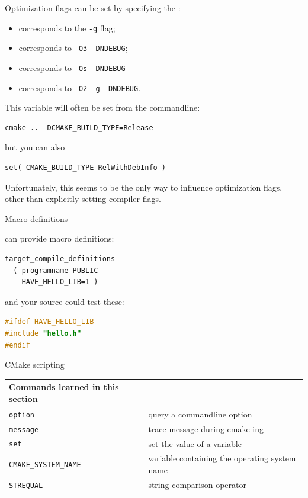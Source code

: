 Optimization flags can be set by specifying the :
\begin{itemize}
\item 
     corresponds to the \lstinline[language=shell]{-g} flag;
\item
     corresponds to \lstinline[language=shell]{-O3 -DNDEBUG};
\item
     corresponds to \lstinline[language=shell]{-Os -DNDEBUG}
\item 
     corresponds to \lstinline[language=shell]{-O2 -g -DNDEBUG}.
\end{itemize}
This variable will often be set from the commandline:
\begin{lstlisting}[language=shell]
cmake .. -DCMAKE_BUILD_TYPE=Release
\end{lstlisting}
but you can also
\begin{lstlisting}
set( CMAKE_BUILD_TYPE RelWithDebInfo )
\end{lstlisting}
Unfortunately, this seems to be the only way to influence optimization flags,
other than explicitly setting compiler flags.

 {Macro definitions}

 can provide macro definitions:
\begin{lstlisting}
target_compile_definitions
  ( programname PUBLIC
    HAVE_HELLO_LIB=1 )
\end{lstlisting}
and your source could test these:
\begin{lstlisting}[language=cpp]
#ifdef HAVE_HELLO_LIB
#include "hello.h"
#endif
\end{lstlisting}

 {CMake scripting}
\label{sec:cmake-script}

\begin{tabular}{lp{3in}}
  \toprule
  Commands learned in this section\\
  \midrule
  \lstinline+option+&query a commandline option\\
  \lstinline+message+&trace message during cmake-ing\\
  \lstinline+set+&set the value of a variable\\
  \lstinline+CMAKE_SYSTEM_NAME+&variable containing the operating system name\\
  \lstinline+STREQUAL+&string comparison operator\\
  \bottomrule
\end{tabular}

